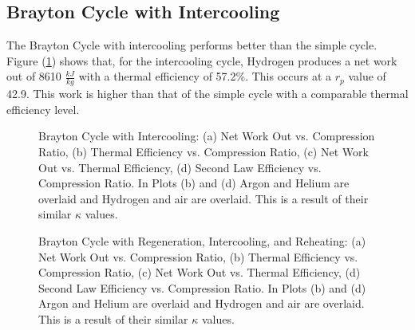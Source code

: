 \documentclass[
	12pt, %
]{brayton_cycle_report_style}
\begin{document}
\subsection{Brayton Cycle with Intercooling} 

The Brayton Cycle with intercooling performs better than the simple cycle. Figure (\ref{fig:Brayton_Cycle_Intercooling}) shows that, for the intercooling cycle, Hydrogen produces a net work out of 8610 $\frac{kJ}{kg}$ with a thermal efficiency of 57.2\%. This occurs at a $r_{p}$ value of 42.9. This work is higher than that of the simple cycle with a comparable thermal efficiency level. 

\begin{figure}%
    \centering
    \subfloat[\centering]{{}}%
    \qquad
    \subfloat[\centering]{{ }}%
    \qquad
    \subfloat[\centering]{{ }}%
    \qquad
    \subfloat[\centering]{{ }}%
    \caption{Brayton Cycle with Intercooling: (a) Net Work Out vs. Compression Ratio, (b) Thermal Efficiency vs. Compression Ratio, (c) Net Work Out vs. Thermal Efficiency, (d) Second Law Efficiency vs. Compression Ratio. In Plots (b) and (d) Argon and Helium are overlaid and Hydrogen and air are overlaid. This is a result of their similar $\kappa$ values.}%
    \label{fig:Brayton_Cycle_Intercooling}%
\end{figure}


\begin{figure}%
    \centering
    \subfloat[\centering]{{}}%
    \qquad
    \subfloat[\centering]{{ }}%
    \qquad
    \subfloat[\centering]{{ }}%
    \qquad
    \subfloat[\centering]{{ }}%
    \caption{Brayton Cycle with Regeneration, Intercooling, and Reheating: (a) Net Work Out vs. Compression Ratio, (b) Thermal Efficiency vs. Compression Ratio, (c) Net Work Out vs. Thermal Efficiency, (d) Second Law Efficiency vs. Compression Ratio. In Plots (b) and (d) Argon and Helium are overlaid and Hydrogen and air are overlaid. This is a result of their similar $\kappa$ values.}%
    \label{fig:Brayton_Cycle_RIR}%
\end{figure}
\end{document}
